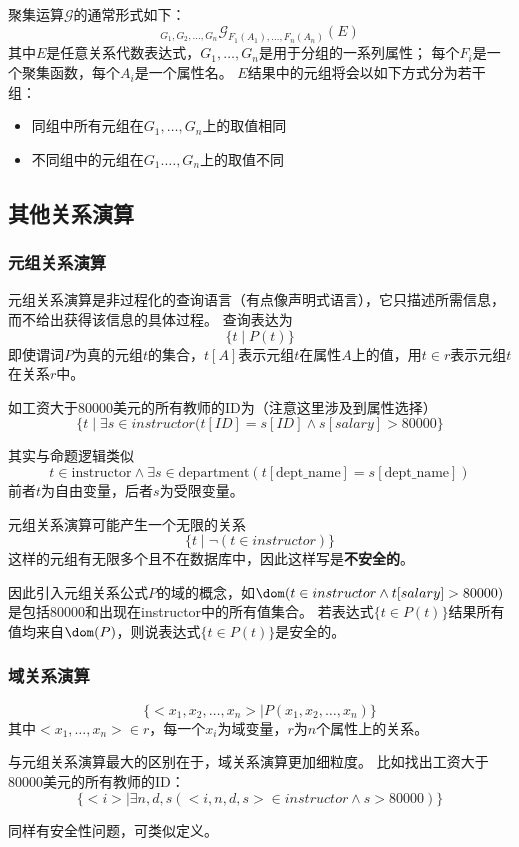 \begin{definition}[聚集运算]
聚集运算$\mathcal{G}$的通常形式如下：
\[{}_{G_1,G_2,\ldots,G_n}\mathcal{G}_{F_1(A_1),\ldots,F_n(A_n)}(E)\]
其中$E$是任意关系代数表达式，$G_1,\ldots,G_n$是用于分组的一系列属性；
每个$F_i$是一个聚集函数，每个$A_i$是一个属性名。
$E$结果中的元组将会以如下方式分为若干组：
\begin{itemize}
	\item 同组中所有元组在$G_1,\ldots,G_n$上的取值相同
	\item 不同组中的元组在$G_1.\ldots,G_n$上的取值不同
\end{itemize}
\end{definition}

\subsection{其他关系演算}
\subsubsection{元组关系演算}
元组关系演算是非过程化的查询语言（有点像声明式语言），它只描述所需信息，而不给出获得该信息的具体过程。
查询表达为
\[\{t\mid P(t)\}\]
即使谓词$P$为真的元组$t$的集合，$t[A]$表示元组$t$在属性$A$上的值，用$t\in r$表示元组$t$在关系$r$中。

如工资大于80000美元的所有教师的ID为（注意这里涉及到属性选择）
\[\{t\mid\exists s\in instructor(t[ID]=s[ID]\land s[salary]>80000\}\]

其实与命题逻辑类似
\[t\in\text{instructor}\land\exists s\in\text{department}(t[\text{dept\_name}]=s[\text{dept\_name}])\]
前者$t$为自由变量，后者$s$为受限变量。

元组关系演算可能产生一个无限的关系
\[\{t\mid\lnot(t\in instructor)\}\]
这样的元组有无限多个且不在数据库中，因此这样写是\textbf{不安全的}。

因此引入元组关系公式$P$的域的概念，如$\dom(t\in instructor\land t[salary]>80000)$是包括80000和出现在instructor中的所有值集合。
若表达式$\{t\in P(t)\}$结果所有值均来自$\dom(P)$，则说表达式$\{t\in P(t)\}$是安全的。

\subsubsection{域关系演算}
\[\{<x_1,x_2,\ldots,x_n>\mid P(x_1,x_2,\ldots,x_n)\}\]
其中$<x_1,\ldots,x_n>\in r$，每一个$x_i$为域变量，$r$为$n$个属性上的关系。

与元组关系演算最大的区别在于，域关系演算更加细粒度。
比如找出工资大于80000美元的所有教师的ID：
\[\{<i>\mid\exists n,d,s(<i,n,d,s>\in instructor\land s>80000)\}\]

同样有安全性问题，可类似定义。